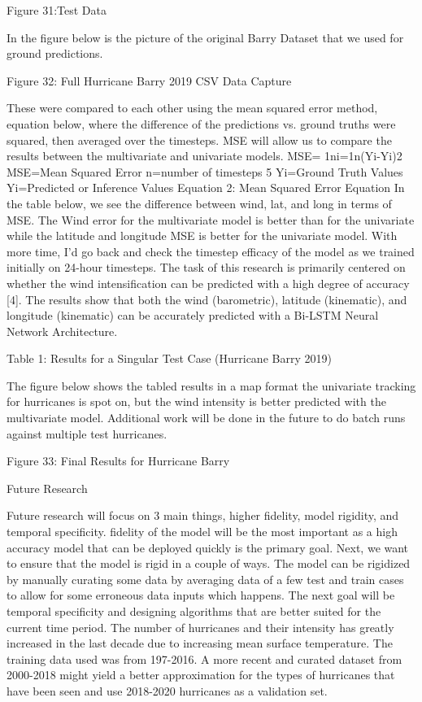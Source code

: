\documentclass{article}
\begin{document}
Figure 31:Test Data

In the figure below is the picture of the original Barry Dataset that we used for ground predictions.

Figure 32: Full Hurricane Barry 2019 CSV Data Capture

These were compared to each other using the mean squared error method, equation below, where the difference of the predictions vs. ground truths were squared, then averaged over the timesteps. MSE will allow us to compare the results between the multivariate and univariate models.
MSE= 1ni=1n(Yi-Yi)2
MSE=Mean Squared Error
n=number of timesteps 5
Yi=Ground Truth Values
Yi=Predicted or Inference Values
Equation 2: Mean Squared Error Equation
In the table below, we see the difference between wind, lat, and long in terms of MSE. The Wind error for the multivariate model is better than for the univariate while the latitude and longitude MSE is better for the univariate model. With more time, I’d go back and check the timestep efficacy of the model as we trained initially on 24-hour timesteps. The task of this research is primarily centered on whether the wind intensification can be predicted with a high degree of accuracy [4]. The results show that both the wind (barometric), latitude (kinematic), and longitude (kinematic) can be accurately predicted with a Bi-LSTM Neural Network Architecture.

Table 1: Results for a Singular Test Case (Hurricane Barry 2019)

The figure below shows the tabled results in a map format the univariate tracking for hurricanes is spot on, but the wind intensity is better predicted with the multivariate model. Additional work will be done in the future to do batch runs against multiple test hurricanes. 

Figure 33: Final Results for Hurricane Barry

Future Research

Future research will focus on 3 main things, higher fidelity, model rigidity, and temporal specificity. fidelity of the model will be the most important as a high accuracy model that can be deployed quickly is the primary goal. Next, we want to ensure that the model is rigid in a couple of ways. The model can be rigidized by manually curating some data by averaging data of a few test and train cases to allow for some erroneous data inputs which happens. The next goal will be temporal specificity and designing algorithms that are better suited for the current time period. The number of hurricanes and their intensity has greatly increased in the last decade due to increasing mean surface temperature. The training data used was from 197-2016. A more recent and curated dataset from 2000-2018 might yield a better approximation for the types of hurricanes that have been seen and use 2018-2020 hurricanes as a validation set. 
\end{document}
